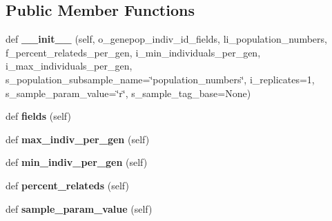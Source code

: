 \subsection*{Public Member Functions}
\begin{DoxyCompactItemize}
\item 
def {\bfseries \+\_\+\+\_\+init\+\_\+\+\_\+} (self, o\+\_\+genepop\+\_\+indiv\+\_\+id\+\_\+fields, li\+\_\+population\+\_\+numbers, f\+\_\+percent\+\_\+relateds\+\_\+per\+\_\+gen, i\+\_\+min\+\_\+individuals\+\_\+per\+\_\+gen, i\+\_\+max\+\_\+individuals\+\_\+per\+\_\+gen, s\+\_\+population\+\_\+subsample\+\_\+name=\char`\"{}population\+\_\+numbers\char`\"{}, i\+\_\+replicates=1, s\+\_\+sample\+\_\+param\+\_\+value=\char`\"{}r\char`\"{}, s\+\_\+sample\+\_\+tag\+\_\+base=None)\hypertarget{classnegui_1_1genepopfilesampler_1_1GenepopFileSampleParamsAgeStructureRelateds_a251169c0b98b7430eee0fec763a94124}{}\label{classnegui_1_1genepopfilesampler_1_1GenepopFileSampleParamsAgeStructureRelateds_a251169c0b98b7430eee0fec763a94124}

\item 
def {\bfseries fields} (self)\hypertarget{classnegui_1_1genepopfilesampler_1_1GenepopFileSampleParamsAgeStructureRelateds_a863d3746d851e8b17c93a50c11ef14c4}{}\label{classnegui_1_1genepopfilesampler_1_1GenepopFileSampleParamsAgeStructureRelateds_a863d3746d851e8b17c93a50c11ef14c4}

\item 
def {\bfseries max\+\_\+indiv\+\_\+per\+\_\+gen} (self)\hypertarget{classnegui_1_1genepopfilesampler_1_1GenepopFileSampleParamsAgeStructureRelateds_ae98a0a07dffb1a63530c81f759d9f58e}{}\label{classnegui_1_1genepopfilesampler_1_1GenepopFileSampleParamsAgeStructureRelateds_ae98a0a07dffb1a63530c81f759d9f58e}

\item 
def {\bfseries min\+\_\+indiv\+\_\+per\+\_\+gen} (self)\hypertarget{classnegui_1_1genepopfilesampler_1_1GenepopFileSampleParamsAgeStructureRelateds_a6954cd905f7bb561d30215ac7e0b6954}{}\label{classnegui_1_1genepopfilesampler_1_1GenepopFileSampleParamsAgeStructureRelateds_a6954cd905f7bb561d30215ac7e0b6954}

\item 
def {\bfseries percent\+\_\+relateds} (self)\hypertarget{classnegui_1_1genepopfilesampler_1_1GenepopFileSampleParamsAgeStructureRelateds_a0112214fdc3420d19624f6de7b75ee3d}{}\label{classnegui_1_1genepopfilesampler_1_1GenepopFileSampleParamsAgeStructureRelateds_a0112214fdc3420d19624f6de7b75ee3d}

\item 
def {\bfseries sample\+\_\+param\+\_\+value} (self)\hypertarget{classnegui_1_1genepopfilesampler_1_1GenepopFileSampleParamsAgeStructureRelateds_abc3ff4bf941636c7819686bc2c06f013}{}\label{classnegui_1_1genepopfilesampler_1_1GenepopFileSampleParamsAgeStructureRelateds_abc3ff4bf941636c7819686bc2c06f013}

\end{DoxyCompactItemize}


